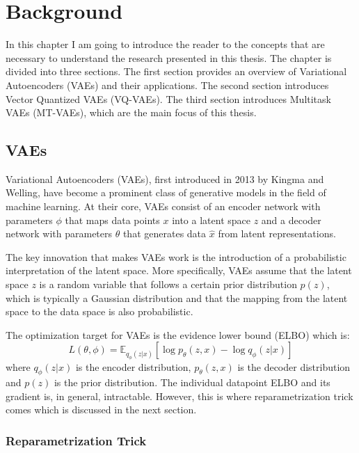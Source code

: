 \chapter{Background}

In this chapter I am going to introduce the reader to the concepts that are necessary to understand the research presented in this thesis. The chapter is divided into three sections. The first section provides an overview of Variational Autoencoders (VAEs) and their applications. The second section introduces Vector Quantized VAEs (VQ-VAEs). The third section introduces Multitask VAEs (MT-VAEs), which are the main focus of this thesis.

\section{VAEs}

Variational Autoencoders (VAEs), first introduced in 2013 by Kingma and Welling\cite{kingma2022autoencoding}, have become a prominent class of generative models in the field of machine learning.  At their core, VAEs consist of an encoder network with parameters $\phi$ that maps data points $x$ into a latent space $z$ and a decoder network with parameters $\theta$ that generates data $\hat{x}$ from latent representations\cite{Kingma_2019}. 

The key innovation that makes VAEs work is the introduction of a probabilistic interpretation of the latent space. More specifically, VAEs assume that the latent space $z$ is a random variable that follows a certain prior distribution $p(z)$, which is typically a Gaussian distribution and that the mapping from the latent space to the data space is also probabilistic\cite{kingma2022autoencoding}.

The optimization target for VAEs is the evidence lower bound (ELBO) which is: \[ L(\theta, \phi) = \mathbb{E}_{q_{\phi}(z|x)} [\log p_{\theta}(z, x) - \log q_{\phi}(z|x)] \] where $q_{\phi}(z|x)$ is the encoder distribution, $p_{\theta}(z, x)$ is the decoder distribution and $p(z)$ is the prior distribution. The individual datapoint ELBO and its gradient is, in general, intractable. However, this is where reparametrization trick comes which is discussed in the next section.
\subsection{Reparametrization Trick}

